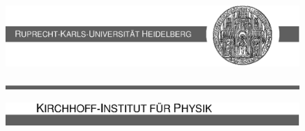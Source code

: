 \begin{titlepage}

\textwidth 		14cm
\textheight 		27.0cm

\evensidemargin    	-1.5cm
\oddsidemargin   	-1.5cm
\topmargin     		-3.0cm

\thispagestyle{empty}


\begin{figure}
\includegraphics{fig/cover/Publ-Cover1.eps}
\end{figure}

\vspace*{3cm}

\hspace{5cm}
\begin{minipage}{8.2cm}
\begin{flushright}
\Large{\sf{\thesisAuthor}}
\end{flushright}
\end{minipage}


\begin{figure}[ h]
\includegraphics{fig/cover/Publ-Cover2.eps}
\end{figure}

\vspace*{3mm}

\hspace{3cm}
\begin{minipage}{10.2cm}
\begin{flushright}
\Large{\sf{\thesisTitle}}
\end{flushright}

\vspace*{3mm}

\vspace*{4mm}

\begin{flushright} \Large{\sf{
}}
\end{flushright}

\end{minipage}


\begin{figure} [b]
\includegraphics{fig/cover/Publ-Cover3.eps}
\end{figure}

\end{titlepage}
